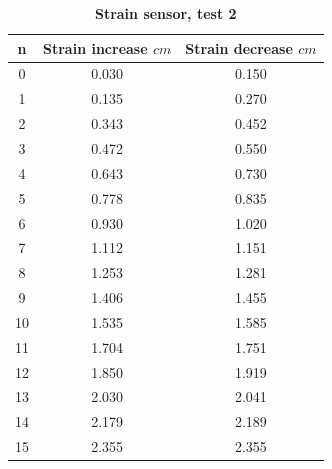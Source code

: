 \documentclass[12pt,a4paper,UTF8]{article}
\begin{document}
\begin{table}[htbp]
\begin{minipage}{0.5\textwidth}
\begin{tabular}{ccc}
                \toprule
                n & Strain increase $cm$ & Strain decrease $cm$ \\
                \midrule               
                0 & 0.030 & 0.150 \\
                1 & 0.135 & 0.270 \\
                2 & 0.343 & 0.452 \\
                3 & 0.472 & 0.550 \\
                4 & 0.643 & 0.730 \\
                5 & 0.778 & 0.835 \\
                6 & 0.930 & 1.020 \\
                7 & 1.112 & 1.151 \\
                8 & 1.253 & 1.281 \\
                9 & 1.406 & 1.455 \\
                10 & 1.535 & 1.585 \\
                11 & 1.704 & 1.751 \\
                12 & 1.850 & 1.919 \\
                13 & 2.030 & 2.041 \\
                14 & 2.179 & 2.189 \\
                15 & 2.355 & 2.355 \\
                \bottomrule
            \end{tabular}
            \caption{\textbf{Strain sensor, test 2}}
            \label{tab.2.1.2}
		\end{minipage}
	\end{table}
\end{document}
